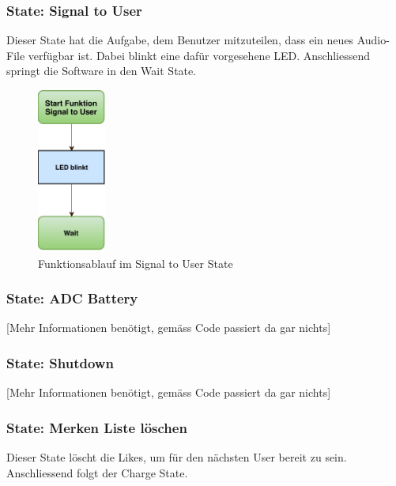 \subsubsection*{State: Signal to User}

Dieser State hat die Aufgabe, dem Benutzer mitzuteilen, dass ein neues Audio-File verfügbar ist. Dabei blinkt eine dafür vorgesehene LED. Anschliessend springt die Software in den Wait State.

\begin{figure}[htbp!!!!]
	\centering
	\includegraphics[width=0.2\textwidth]{Data/SignalToUser_picture.pdf}
	\caption[Statemachine: Signal to User]{Funktionsablauf im Signal to User State}
	\label{fig:signalToUserState}
\end{figure} 

\subsubsection*{State: ADC Battery}

[Mehr Informationen benötigt, gemäss Code passiert da gar nichts]

\subsubsection*{State: Shutdown}

[Mehr Informationen benötigt, gemäss Code passiert da gar nichts]

\subsubsection*{State: Merken Liste löschen}

Dieser State löscht die Likes, um für den nächsten User bereit zu sein. Anschliessend folgt der Charge State.

